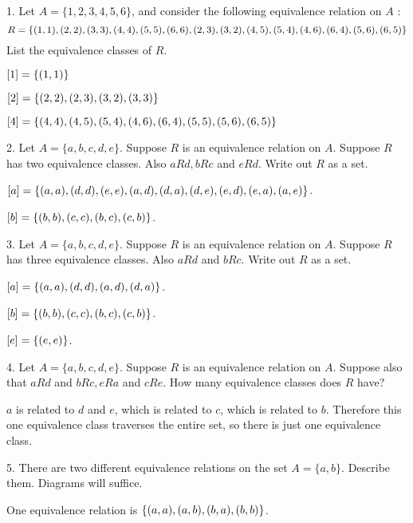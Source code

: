 \documentclass{idrisMemo}
\begin{document}
\toc
\thispagestyle{styleTOC}
\pagebreak
\pagestyle{styleE}

\begin{prooflist}{1. Let $A=\{1,2,3,4,5,6\}$, and consider the following
    equivalence relation on $A$ :
    \[
R=\{(1,1),(2,2),(3,3),(4,4),(5,5),(6,6),(2,3),(3,2),(4,5),(5,4),(4,6),(6,4),(5,6),(6,5)\}
\]
List the equivalence classes of $R$.
}
\item $[1]=\{(1, 1)\}$
\item $[2]=\{(2, 2), (2, 3), (3, 2), (3, 3)\}$
\item $[4]=\{(4, 4), (4, 5), (5, 4), (4, 6), (6, 4), (5,5), (5, 6), (6, 5) \}$
\end{prooflist}

\begin{prooflist}{2. Let $A=\{a, b, c, d, e\}$. Suppose $R$ is an equivalence
    relation on $A$. Suppose $R$ has two equivalence classes. Also $a R d, b R
c$ and $e R d$. Write out $R$ as a set.}
\item $[a] = \{(a, a), (d, d), (e, e), (a, d), (d, a), (d, e), (e, d), (e,
    a), (a, e)\}$.
\item $[b] = \{(b, b), (c, c), (b, c), (c, b)\}$.
\end{prooflist}

\begin{prooflist}{3. Let $A=\{a, b, c, d, e\}$. Suppose $R$ is an equivalence
relation on $A$. Suppose $R$ has three equivalence classes. Also $a R d$ and $b
R c$. Write out $R$ as a set.}
\item $[a] = \{(a, a), (d, d), (a, d), (d, a)\}$.
\item $[b] = \{(b, b), (c, c), (b, c), (c, b)\}$.
\item $[e] = \{(e, e)\}$.
\end{prooflist}

\begin{prooflist}{4. Let $A=\{a, b, c, d, e\}$. Suppose $R$ is an equivalence
relation on $A$. Suppose also that $a R d$ and $b R c, e R a$ and $c R e$. How
many equivalence classes does $R$ have?}
\item $a$ is related to $d$ and $e$, which is related to $c$, which is related
    to $b$. Therefore this one equivalence class traverses the entire set, so
    there is just one equivalence class.
\end{prooflist}

\begin{prooflist}{5. There are two different equivalence relations on the set
$A=\{a, b\}$. Describe them. Diagrams will suffice.}
\item One equivalence relation is $\{(a, a), (a, b), (b, a), (b, b)\}$.
\end{prooflist}
\end{document}

